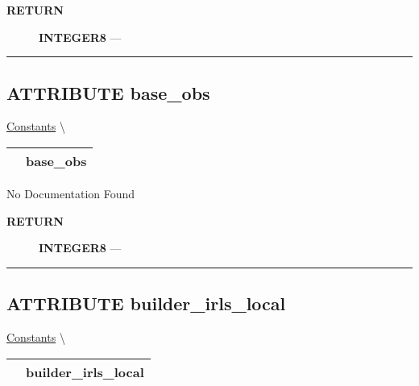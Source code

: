 \par
\begin{description}
\item [\colorbox{tagtype}{\color{white} \textbf{\textsf{RETURN}}}] \textbf{INTEGER8} --- 
\end{description}




\rule{\linewidth}{0.5pt}
\subsection*{\textsf{\colorbox{headtoc}{\color{white} ATTRIBUTE}
base\_obs}}

\hypertarget{ecldoc:logisticregression.constants.base_obs}{}
\hspace{0pt} \hyperlink{ecldoc:LogisticRegression.Constants}{Constants} \textbackslash 

{\renewcommand{\arraystretch}{1.5}
\begin{tabularx}{\textwidth}{|>{\raggedright\arraybackslash}l|X|}
\hline
\hspace{0pt}\mytexttt{\color{red} } & \textbf{base\_obs} \\
\hline
\end{tabularx}
}

\par





No Documentation Found








\par
\begin{description}
\item [\colorbox{tagtype}{\color{white} \textbf{\textsf{RETURN}}}] \textbf{INTEGER8} --- 
\end{description}




\rule{\linewidth}{0.5pt}
\subsection*{\textsf{\colorbox{headtoc}{\color{white} ATTRIBUTE}
builder\_irls\_local}}

\hypertarget{ecldoc:logisticregression.constants.builder_irls_local}{}
\hspace{0pt} \hyperlink{ecldoc:LogisticRegression.Constants}{Constants} \textbackslash 

{\renewcommand{\arraystretch}{1.5}
\begin{tabularx}{\textwidth}{|>{\raggedright\arraybackslash}l|X|}
\hline
\hspace{0pt}\mytexttt{\color{red} } & \textbf{builder\_irls\_local} \\
\hline
\end{tabularx}
}

